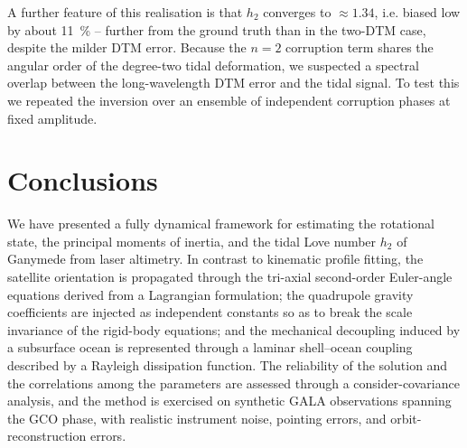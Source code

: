 \documentclass[lineno, pdflatex,sn-mathphys-ay]{sn-jnl}
\theoremstyle{thmstyleone}%
\theoremstyle{thmstyletwo}%
\theoremstyle{thmstylethree}%
\begin{document}
A further feature of this realisation is that $h_2$ converges to $\approx\!\num{1.34}$, %
i.e. biased low by about \SI{11}{\percent} -- further from the ground truth than in the two-DTM case, despite the milder DTM error. Because the $n=2$ corruption term shares the angular order of the degree-two tidal deformation, we suspected a spectral overlap between the long-wavelength DTM error and the tidal signal. To test this we repeated the inversion over an ensemble of independent corruption phases at fixed amplitude.

\section{Conclusions}\label{sec:conclusions}

We have presented a fully dynamical framework for estimating the rotational state, the principal moments of inertia, and the tidal Love number $h_2$ of Ganymede from laser altimetry. In contrast to kinematic profile fitting, the satellite orientation is propagated through the tri-axial second-order Euler-angle equations derived from a Lagrangian formulation; the quadrupole gravity coefficients are injected as independent constants so as to break the scale invariance of the rigid-body equations; and the mechanical decoupling induced by a subsurface ocean is represented through a laminar shell--ocean coupling described by a Rayleigh dissipation function. The reliability of the solution and the correlations among the parameters are assessed through a consider-covariance analysis, and the method is exercised on synthetic GALA observations spanning the GCO phase, with realistic instrument noise, pointing errors, and orbit-reconstruction errors.
\end{document}
